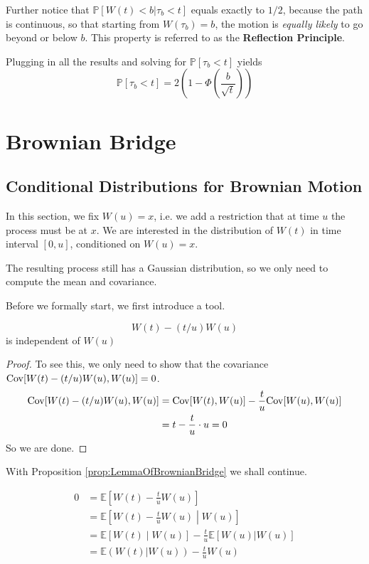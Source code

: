     Further notice that $\mathbb{P}[W(t) < b | \tau_b < t]$ equals exactly to $1/2$, because the path is continuous, so that starting from $W(\tau_b) = b$, the motion is \emph{equally likely} to go beyond or below $b$. This property is referred to as the \textbf{Reflection Principle}.

    Plugging in all the results and solving for $\mathbb{P}[\tau_b < t]$ yields
    \[ \mathbb{P}[\tau_b < t] = 2 \left( 1 - \Phi\left(\frac{b}{\sqrt{t}}\right) \right) \]


\section{Brownian Bridge}
    \subsection{Conditional Distributions for Brownian Motion}
        In this section, we fix $W(u) = x$, i.e. we add a restriction that at time $u$ the process must be at $x$. We are interested in the distribution of $W(t)$ in time interval $[0,u]$, conditioned on $W(u)=x$.

        The resulting process still has a Gaussian distribution, so we only need to compute the mean and covariance.

        Before we formally start, we first introduce a tool.
        \begin{proposition}\label{prop:LemmaOfBrownianBridge}
            \[ W(t) - (t/u)W(u) \]
            is independent of $W(u)$
        \end{proposition}
        \begin{proof}
            To see this, we only need to show that the covariance $\mathrm{Cov}[W(t)-(t/u)W(u), W(u)] = 0$.
            \begin{align*}
                \mathrm{Cov}[W(t) - (t/u)W(u), W(u)] &= \mathrm{Cov}[W(t),W(u)] - \frac{t}{u}\mathrm{Cov}[W(u), W(u)]\\
                &= t - \frac{t}{u} \cdot u = 0
            \end{align*}
            So we are done.
        \end{proof}

        With Proposition \ref{prop:LemmaOfBrownianBridge} we shall continue.

        \begin{align*}
            0 &= \mathbb{E}\left[ W(t) - \frac{t}{u}W(u) \right]\\
            &= \mathbb{E}\left[ W(t) - \frac{t}{u} W(u) \middle| W(u) \right]\\
            &= \mathbb{E}\left[ W(t) \middle| W(u) \right] - \frac{t}{u}\mathbb{E}[W(u) | W(u)]\\
            &= \mathbb{E}\left(W(t) | W(u)\right) - \frac{t}{u}W(u)
        \end{align*}

